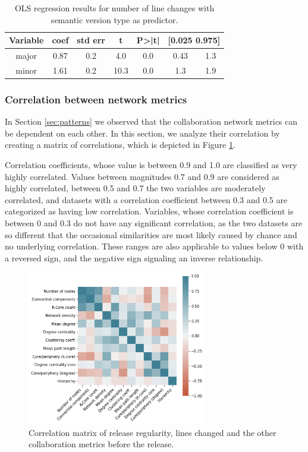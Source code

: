 \begin{table}
    \centering
        \begin{tabular}{|c|c|c|c|c|c|c|}
            \hline
            \textbf{Variable} & \textbf{coef} & \textbf{std err} & \textbf{t} & \textbf{P>|t|} & \multicolumn{2}{|c|}{\textbf{[0.025  0.975]}} \\
            \hline
            major & 0.87 & 0.2 & 4.0 & 0.0 & 0.43 & 1.3 \\
            minor & 1.61 & 0.2 & 10.3 & 0.0 & 1.3 & 1.9 \\
            \hline
        \end{tabular}
    \caption{OLS regression results for number of line changes with semantic version type as predictor.}
    \label{tab:linreg_lines}
\end{table}

\subsubsection{Correlation between network metrics}
In Section \ref{sec:patterns} we observed that the collaboration network metrics can be dependent on each other. In this section, we analyze their correlation by creating a matrix of correlations, which is depicted in Figure \ref{fig:corr_matrix}.

Correlation coefficients, whose value is between 0.9 and 1.0 are classified as very highly correlated. Values between magnitudes 0.7 and 0.9 are considered as highly correlated, between 0.5 and 0.7 the two variables are moderately correlated, and datasets with a correlation coefficient between 0.3 and 0.5 are categorized as having low correlation. Variables, whose correlation coefficient is between 0 and 0.3 do not have any significant correlation, as the two datasets are so different that the occasional similarities are most likely caused by chance and no underlying correlation. These ranges are also applicable to values below 0 with a reversed sign, and the negative sign signaling an inverse relationship.

\begin{figure}
    \centering
    \includegraphics[width=0.7\textwidth]{figures/quantitative/corr_matrix/corr_before.png}
    \caption{Correlation matrix of release regularity, lines changed and the other collaboration metrics before the release.}
    \label{fig:corr_matrix}
\end{figure}

